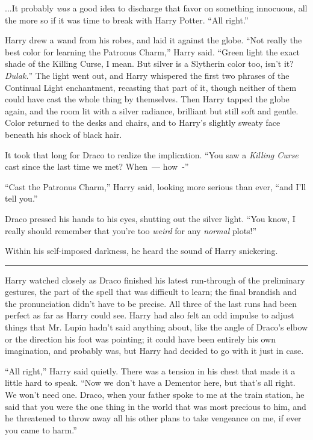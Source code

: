 ...It probably \emph{was} a good idea to discharge that favor on something innocuous, all the more so if it was time to break with Harry Potter. ``All right.''

Harry drew a wand from his robes, and laid it against the globe. ``Not really the best color for learning the Patronus Charm,'' Harry said. ``Green light the exact shade of the Killing Curse, I mean. But silver is a Slytherin color too, isn't it? \emph{Dulak.}'' The light went out, and Harry whispered the first two phrases of the Continual Light enchantment, recasting that part of it, though neither of them could have cast the whole thing by themselves. Then Harry tapped the globe again, and the room lit with a silver radiance, brilliant but still soft and gentle. Color returned to the desks and chairs, and to Harry's slightly sweaty face beneath his shock of black hair.

It took that long for Draco to realize the implication. ``You saw a \emph{Killing Curse} cast since the last time we met? When~--- how~-''

``Cast the Patronus Charm,'' Harry said, looking more serious than ever, ``and I'll tell you.''

Draco pressed his hands to his eyes, shutting out the silver light. ``You know, I really should remember that you're too \emph{weird} for any \emph{normal} plots!''

Within his self-imposed darkness, he heard the sound of Harry snickering.

\begin{center}\rule{3in}{0.4pt}\end{center}

Harry watched closely as Draco finished his latest run-through of the preliminary gestures, the part of the spell that was difficult to learn; the final brandish and the pronunciation didn't have to be precise. All three of the last runs had been perfect as far as Harry could see. Harry had also felt an odd impulse to adjust things that Mr. Lupin hadn't said anything about, like the angle of Draco's elbow or the direction his foot was pointing; it could have been entirely his own imagination, and probably was, but Harry had decided to go with it just in case.

``All right,'' Harry said quietly. There was a tension in his chest that made it a little hard to speak. ``Now we don't have a Dementor here, but that's all right. We won't need one. Draco, when your father spoke to me at the train station, he said that you were the one thing in the world that was most precious to him, and he threatened to throw away all his other plans to take vengeance on me, if ever you came to harm.''


